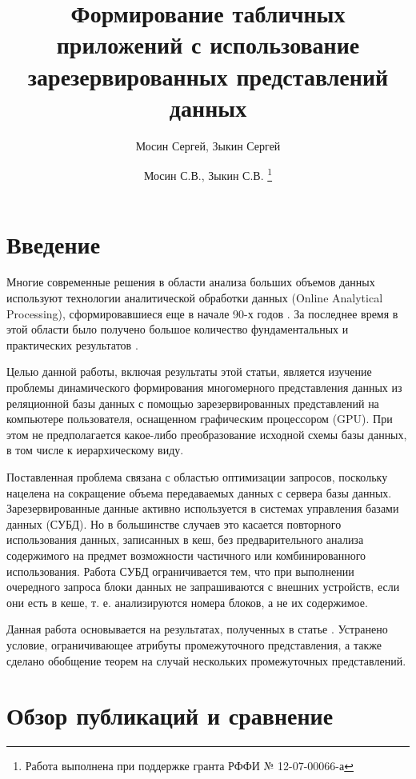 \documentclass[10pt,a4paper]{article}
\author{Мосин Сергей, Зыкин Сергей}
\title{Формирование табличных приложений с использование зарезервированных представлений данных}
\author{
Мосин С.В., Зыкин С.В. \footnote{Работа выполнена при поддержке гранта РФФИ № 12-07-00066-а}
}
\date{}
\begin{document}
\maketitle

\section{Введение}

Многие современные решения в области анализа больших объемов данных
используют технологии аналитической обработки данных (Online Analytical
Processing), сформировавшиеся еще в начале 90-х годов \cite{codd}. За последнее
время в этой области было получено большое количество фундаментальных
\cite{lecht,lehner,mazon} и практических результатов \cite{vassi, peder,
progressive, giorg}.

Целью данной работы, включая результаты этой статьи, является изучение
проблемы динамического формирования
многомерного представления данных из реляционной базы данных с
помощью зарезервированных представлений на компьютере пользователя, оснащенном
графическим процессором (GPU). При этом не предполагается какое-либо преобразование
исходной схемы базы данных, в том числе к иерархическому виду.

Поставленная проблема связана с областью оптимизации
запросов, поскольку нацелена на сокращение объема передаваемых данных с сервера
базы данных. Зарезервированные данные активно используется в системах управления базами
данных (СУБД). Но в большинстве случаев это касается повторного использования
данных, записанных в кеш, без предварительного анализа
содержимого на предмет возможности частичного или комбинированного
использования. Работа СУБД ограничивается тем, что при выполнении очередного
запроса блоки данных не запрашиваются с внешних устройств, если они есть в
кеше, т. е. анализируются номера блоков, а не их содержимое.

Данная работа основывается на результатах, полученных в
статье \cite{zyk_pol}. Устранено условие, ограничивающее атрибуты промежуточного
представления, а также сделано обобщение теорем на случай нескольких
промежуточных представлений.

\section{Обзор публикаций и сравнение}
\end{document}
